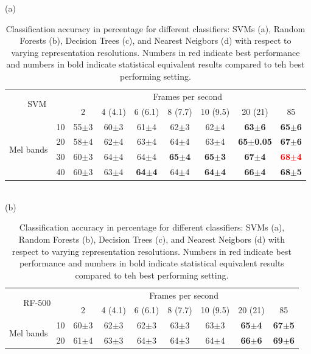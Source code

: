 \documentclass[final,3p,times,twocolumn]{elsarticle}
\begin{document}
\begin{table}[h]
\centering
\caption{Classification accuracy in percentage for different classifiers: SVMs (a), Random Forests (b), Decision Trees (c), and Nearest Neigbors (d) with respect to varying representation resolutions. Numbers in red indicate best performance and numbers in bold indicate statistical equivalent results compared to teh best performing setting.}
\label{T1}
(a)\\
\begin{tabular}{ll|c|c|c|c|c|c|c|}
\cline{3-9}
\multicolumn{2}{c}{\multirow{2}{*}{SVM}} & \multicolumn{7}{|c|}{Frames per second}\\ \cline{3-9}
 & & 2 & 4 (4.1) & 6 (6.1) & 8 (7.7) & 10 (9.5) & 20 (21) & 85 \\ \cline{1-9}
\multicolumn{1}{|c}{\multirow{4}{*}{Mel bands}}
 & \multicolumn{1}{|c|}{10} & 55$\pm$3 & 60$\pm$3 & 61$\pm$4 & 62$\pm$3 & 62$\pm$4 & \textbf{63$\pm$6} & \textbf{65$\pm$6} \\ \cline{2-9}
\multicolumn{1}{|c}{}
 & \multicolumn{1}{|c|}{20} & 58$\pm$4 & 62$\pm$4 & 63$\pm$4 & 64$\pm$4 & 63$\pm$4 & \textbf{65$\pm$0.05} & \textbf{67$\pm$6} \\ \cline{2-9}
\multicolumn{1}{|c}{}
 & \multicolumn{1}{|c|}{30} & 60$\pm$3 & 64$\pm$4 & 64$\pm$4 & \textbf{65$\pm$4} & \textbf{65$\pm$3} & \textbf{67$\pm$4} & \textbf{\textcolor{red}{68$\pm$4}} \\ \cline{2-9}
\multicolumn{1}{|c}{}
 & \multicolumn{1}{|c|}{40} & 60$\pm$3 & 63$\pm$4 & \textbf{64$\pm$4} & 64$\pm$4 & \textbf{64$\pm$4} & \textbf{66$\pm$4} & \textbf{68$\pm$5} \\ \cline{1-9}
\end{tabular}
\\(b)\\
\begin{tabular}{ll|c|c|c|c|c|c|c|}
\cline{3-9}
\multicolumn{2}{c}{\multirow{2}{*}{RF-500}} & \multicolumn{7}{|c|}{Frames per second}\\ \cline{3-9}
 & & 2 & 4 (4.1) & 6 (6.1) & 8 (7.7) & 10 (9.5) & 20 (21) & 85 \\ \cline{1-9}
\multicolumn{1}{|c}{\multirow{4}{*}{Mel bands}}
 & \multicolumn{1}{|c|}{10} & 60$\pm$3 & 62$\pm$3 & 62$\pm$3 & 63$\pm$3 & 63$\pm$3 & \textbf{65$\pm$4} & \textbf{67$\pm$5} \\ \cline{2-9}
\multicolumn{1}{|c}{}
 & \multicolumn{1}{|c|}{20} & 61$\pm$4 & 63$\pm$3 & 64$\pm$3 & 64$\pm$3 & 64$\pm$4 & \textbf{66$\pm$6} & \textbf{69$\pm$6} \\ \cline{2-9}

\end{tabular}
\end{table}
\end{document}
